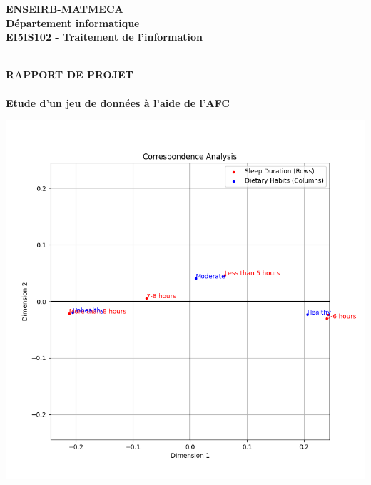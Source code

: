  \begin{titlepage}
      \begin{center}
%		
\begin{minipage}{10cm}
	\begin{center}
	\textbf{ENSEIRB-MATMECA}\\[0.3cm]
  \textbf{Département informatique}\\[.1cm]
    \textbf{EI5IS102 - Traitement de l'information}


	\end{center}
\end{minipage}\\[1cm]
%




{\Huge \bfseries \uppercase{Rapport de projet} \\[0.5cm] }
\textsc{\Large }\\[.7cm]

{ \huge \bfseries Etude d'un jeu de données à l'aide de l'AFC\\[1cm] }


\includegraphics[scale=.8]{Sleep_Dietary.png}


\end{center}
\end{titlepage}
